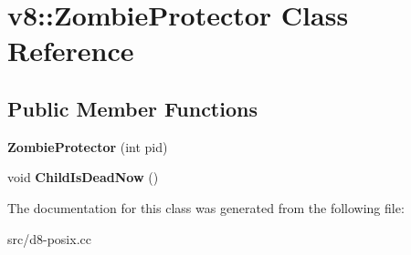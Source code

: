 \hypertarget{classv8_1_1_zombie_protector}{}\section{v8\+:\+:Zombie\+Protector Class Reference}
\label{classv8_1_1_zombie_protector}
\subsection*{Public Member Functions}
\begin{DoxyCompactItemize}
\item 
\hypertarget{classv8_1_1_zombie_protector_ada6e7c6ad75a7e51dd15d747e30296ec}{}{\bfseries Zombie\+Protector} (int pid)\label{classv8_1_1_zombie_protector_ada6e7c6ad75a7e51dd15d747e30296ec}

\item 
\hypertarget{classv8_1_1_zombie_protector_afd835b383e9b8127209d8dc518637f23}{}void {\bfseries Child\+Is\+Dead\+Now} ()\label{classv8_1_1_zombie_protector_afd835b383e9b8127209d8dc518637f23}

\end{DoxyCompactItemize}


The documentation for this class was generated from the following file\+:\begin{DoxyCompactItemize}
\item 
src/d8-\/posix.\+cc\end{DoxyCompactItemize}
